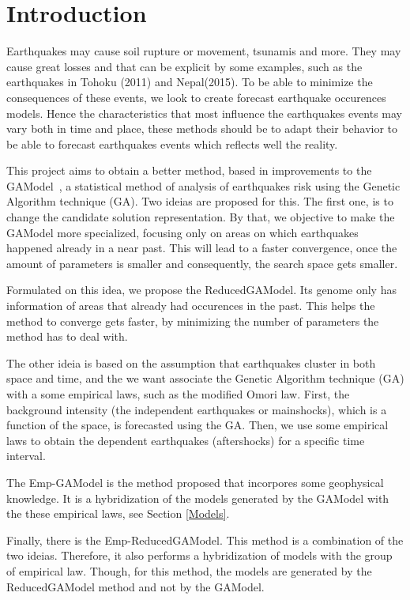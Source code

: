 
\section{Introduction}\label{intro}

Earthquakes may cause soil rupture or movement, tsunamis and
more. They may cause great losses and that can be explicit by some
examples, such as the earthquakes in Tohoku (2011) and Nepal(2015). To
be able to minimize the consequences of these events, we look to
create forecast earthquake occurences models. Hence the
characteristics that most influence the earthquakes events may vary
both in time and place, these methods should be to adapt their
behavior to be able to forecast earthquakes events which reflects well
the reality.

This project aims to obtain a better method, based in improvements to
the GAModel~\cite{ecta14}, a statistical method of analysis of
earthquakes risk using the Genetic Algorithm technique (GA). Two
ideias are proposed for this. The first one, is to change the
candidate solution representation. By that, we objective to make the
GAModel more specialized, focusing only on areas on which earthquakes
happened already in a near past. This will lead to a faster
convergence, once the amount of parameters is smaller and
consequently, the search space gets smaller.

Formulated on this idea, we propose the ReducedGAModel. Its genome
only has information of areas that already had occurences in the
past. This helps the method to converge gets faster, by minimizing the
number of parameters the method has to deal with.

The other ideia is based on the assumption that earthquakes cluster in
both space and time, and the we want associate the Genetic Algorithm
technique (GA) with a some empirical laws, such as the modified Omori
law. First, the background intensity (the independent earthquakes or
mainshocks), which is a function of the space, is forecasted using the
GA. Then, we use some empirical laws to obtain the dependent
earthquakes (aftershocks) for a specific time interval.

The Emp-GAModel is the method proposed that incorpores some
geophysical knowledge. It is a hybridization of the models generated
by the GAModel with the these empirical laws, see Section
\ref{Models}.

Finally, there is the Emp-ReducedGAModel. This method is a combination
of the two ideias. Therefore, it also performs a hybridization of
models with the group of empirical law. Though, for this method, the
models are generated by the ReducedGAModel method and not by the
GAModel.

